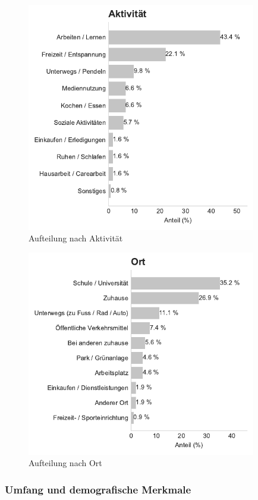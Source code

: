 \begin{figure}[htbp]
    \centering
    \includegraphics[width=10cm]{analysis/plots/cat_dist_activity.pdf}
    \caption{Aufteilung nach Aktivität}
    \label{fig:cat_dist_activity}
\end{figure}

\begin{figure}[htbp]
    \centering
    \includegraphics[width=10cm]{analysis/plots/cat_dist_location_category.pdf}
    \caption{Aufteilung nach Ort}
    \label{fig:cat_dist_location_category}
\end{figure}


\subsubsection{Umfang und demografische Merkmale}

